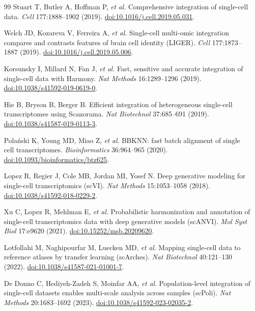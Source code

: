 \documentclass[10pt,twocolumn]{article}
\begin{document}
\begin{thebibliography}{99}
\small
{} Stuart T, Butler A, Hoffman P, \emph{et al.}
Comprehensive integration of single-cell data. \emph{Cell} 177:1888--1902 (2019).
\href{https://doi.org/10.1016/j.cell.2019.05.031}{doi:10.1016/j.cell.2019.05.031}.

 Welch JD, Kozareva V, Ferreira A, \emph{et al.}
Single-cell multi-omic integration compares and contrasts features of brain cell
identity (LIGER). \emph{Cell} 177:1873--1887 (2019).
\href{https://doi.org/10.1016/j.cell.2019.05.006}{doi:10.1016/j.cell.2019.05.006}.

 Korsunsky I, Millard N, Fan J, \emph{et al.}
Fast, sensitive and accurate integration of single-cell data with Harmony.
\emph{Nat Methods} 16:1289--1296 (2019).
\href{https://doi.org/10.1038/s41592-019-0619-0}{doi:10.1038/s41592-019-0619-0}.

 Hie B, Bryson B, Berger B.
Efficient integration of heterogeneous single-cell transcriptomes using Scanorama.
\emph{Nat Biotechnol} 37:685--691 (2019).
\href{https://doi.org/10.1038/s41587-019-0113-3}{doi:10.1038/s41587-019-0113-3}.

 Pola\'nski K, Young MD, Miao Z, \emph{et al.}
BBKNN: fast batch alignment of single cell transcriptomes.
\emph{Bioinformatics} 36:964--965 (2020).
\href{https://doi.org/10.1093/bioinformatics/btz625}{doi:10.1093/bioinformatics/btz625}.

 Lopez R, Regier J, Cole MB, Jordan MI, Yosef N.
Deep generative modeling for single-cell transcriptomics (scVI).
\emph{Nat Methods} 15:1053--1058 (2018).
\href{https://doi.org/10.1038/s41592-018-0229-2}{doi:10.1038/s41592-018-0229-2}.

 Xu C, Lopez R, Mehlman E, \emph{et al.}
Probabilistic harmonization and annotation of single-cell transcriptomics data with
deep generative models (scANVI). \emph{Mol Syst Biol} 17:e9620 (2021).
\href{https://doi.org/10.15252/msb.20209620}{doi:10.15252/msb.20209620}.

 Lotfollahi M, Naghipourfar M, Luecken MD, \emph{et al.}
Mapping single-cell data to reference atlases by transfer learning (scArches).
\emph{Nat Biotechnol} 40:121--130 (2022).
\href{https://doi.org/10.1038/s41587-021-01001-7}{doi:10.1038/s41587-021-01001-7}.

 De Donno C, Hediyeh-Zadeh S, Moinfar AA, \emph{et al.}
Population-level integration of single-cell datasets enables multi-scale analysis
across samples (scPoli). \emph{Nat Methods} 20:1683--1692 (2023).
\href{https://doi.org/10.1038/s41592-023-02035-2}{doi:10.1038/s41592-023-02035-2}.


\end{thebibliography}
\end{document}
